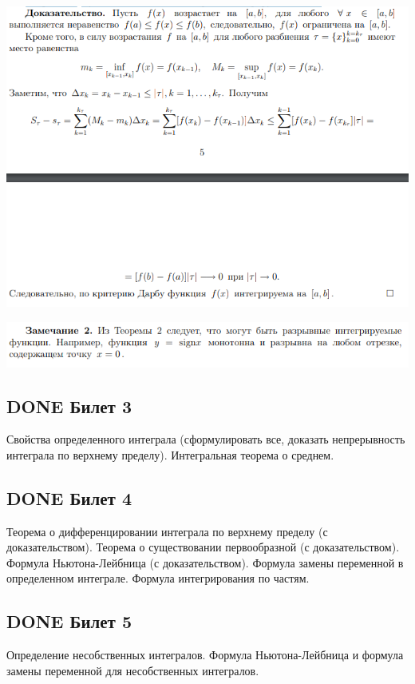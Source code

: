 \documentclass[11pt]{article}
\begin{document}
\begin{center}
\includegraphics[width=.9\linewidth]{img/b2-t4dok.png}
\end{center}

\begin{center}
\includegraphics[width=.9\linewidth]{img/b2-t4zam.png}
\end{center}

\subsection{{\bfseries\sffamily DONE} Билет 3}
\label{sec:org57cd0b3}
Свойства определенного интеграла (сформулировать все, доказать непрерывность интеграла по верхнему пределу). Интегральная теорема о среднем.


\subsection{{\bfseries\sffamily DONE} Билет 4}
\label{sec:org741cc97}
Теорема о дифференцировании интеграла по верхнему пределу (с доказательством).  Теорема о существовании первообразной (с доказательством). Формула Ньютона-Лейбница (с доказательством). Формула замены переменной в определенном интеграле. Формула интегрирования по частям.


\subsection{{\bfseries\sffamily DONE} Билет 5}
\label{sec:org8d5d8a6}
Определение несобственных интегралов.  Формула Ньютона-Лейбница и формула замены переменной для несобственных интегралов.

\end{document}
